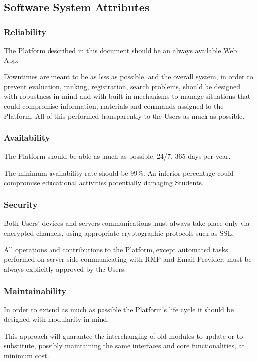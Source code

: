 \subsection{Software System Attributes}

\subsubsection{Reliability}
The Platform described in this document should be an always available Web App. 

Downtimes are meant to be as less as possible, and the overall system, in order to prevent evaluation, ranking, registration, search problems, should be designed with robustness in mind and with built-in mechanisms to manage situations 
that could compromise information, materials and commands assigned to the Platform. All of this performed transparently to the Users as much as possible.

\subsubsection{Availability}
The Platform should be able as much as possible, 24/7, 365 days per year. 

The minimum availability rate should be 99\%. An inferior percentage could compromise educational activities potentially damaging Students.

\subsubsection{Security}
Both Users' devices and servers communications must always take place only via encrypted channels, using appropriate cryptographic protocols such as SSL. 

All operations and contributions to the Platform, except automated tasks performed on server side communicating with RMP and Email Provider, must be always explicitly approved by the Users.

\subsubsection{Maintainability}
In order to extend as much as possible the Platform's life cycle it should be designed with modularity in mind. 

This approach will guarantee the interchanging of old modules to update or to substitute, possibly maintaining the same interfaces and core functionalities, at minimum cost.

